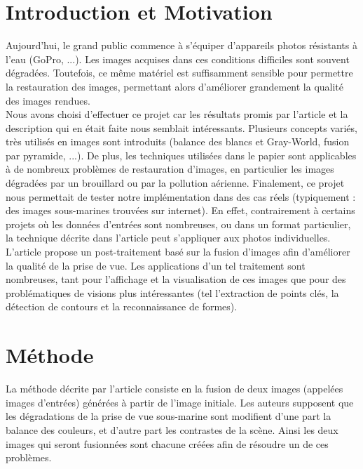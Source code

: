\documentclass[twoside]{article}
\begin{document}
\section{Introduction et Motivation}
Aujourd'hui, le grand public commence à s'équiper d'appareils photos résistants à l'eau (GoPro, ...). Les images acquises dans ces conditions difficiles sont souvent dégradées. Toutefois, ce même matériel est suffisamment sensible pour permettre la restauration des images, permettant alors d'améliorer grandement la qualité des images rendues.\\
Nous avons choisi d'effectuer ce projet car les résultats promis par l'article et la description qui en était faite nous semblait intéressants. Plusieurs concepts variés, très utilisés en images sont introduits (balance des blancs et Gray-World, fusion par pyramide, ...). De plus, les techniques utilisées dans le papier sont applicables à de nombreux problèmes de restauration d'images, en particulier les images dégradées par un brouillard ou par la pollution aérienne. Finalement, ce projet nous permettait de tester notre implémentation dans des cas réels (typiquement : des images sous-marines trouvées sur internet). En effet, contrairement à certains projets où les données d'entrées sont nombreuses, ou dans un format particulier, la technique décrite dans l'article peut s'appliquer aux photos individuelles.\\
L’article propose un post-traitement basé sur la fusion d’images afin d’améliorer la qualité de la prise de vue. Les applications d’un tel traitement sont nombreuses, tant pour l’affichage et la visualisation de ces images que pour des problématiques de visions plus intéressantes (tel l’extraction de points clés, la détection de contours et la reconnaissance de formes).\\


\section{Méthode}

La méthode décrite par l’article consiste en la fusion de deux images (appelées images d'entrées) générées à partir de l’image initiale. Les auteurs supposent que les dégradations de la prise de vue sous-marine sont modifient d'une part la balance des couleurs, et d'autre part les contrastes de la scène. Ainsi les deux images qui seront fusionnées sont chacune créées afin de résoudre un de ces problèmes.\\
\end{document}
